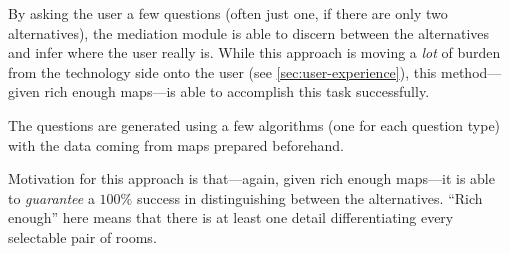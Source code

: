 By asking the user a few questions (often just one, if there are only two alternatives), the mediation module is able to discern between the alternatives and infer where the user really is. While this approach is moving a \emph{lot} of burden from the technology side onto the user (see \cref{sec:user-experience}), this method---given rich enough maps---is able to accomplish this task successfully.

The questions are generated using a few algorithms (one for each question type) with the data coming from maps prepared beforehand.

Motivation for this approach is that---again, given rich enough maps---it is able to \emph{guarantee} a $100\%$ success in distinguishing between the alternatives. ``Rich enough'' here means that there is at least one detail differentiating every selectable pair of rooms.
